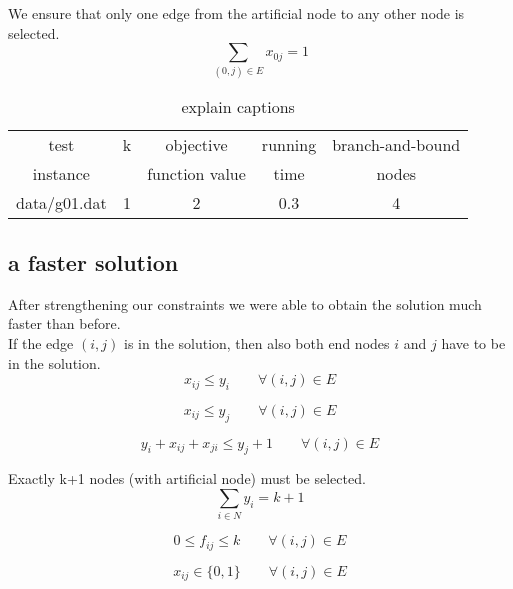 We ensure that only one edge from the artificial node to any
other node is selected.
\begin{equation}
  \sum_{(0,j) \in E} x_{0j} = 1 
\end{equation}

\begin{table} 
\small
\centering
\begin{tabular}{ccccc}
\hline
test     & k & objective      & running & branch-and-bound \\
instance &   & function value & time    & nodes \\
\hline
data/g01.dat 	& 1 & 2 & 0.3 & 4 \\

\hline
\end{tabular}
\caption{explain captions}
\label{tbl:scf_slow}
\end{table}

\subsection{a faster solution}

After strengthening our constraints we were able to obtain the solution much faster than before.\\

If the edge $(i,j)$ is in the solution, then also both end nodes $i$ and $j$ 
have to be in the solution.
\begin{equation}
  x_{ij} \leq y_{i} \qquad \forall (i,j) \in E
  \label{lbl:xy1}
\end{equation}

\begin{equation}
  x_{ij} \leq y_{j} \qquad \forall (i,j) \in E
  \label{lbl:xy2}
\end{equation}

\begin{equation}
 y_{i} + x_{ij} + x_{ji} \leq y_{j} + 1 \qquad \forall (i,j) \in E
 \label{lbl:xy3}
\end{equation}

Exactly k+1 nodes (with artificial node) must be selected.
\begin{equation}
  \sum_{i \in N} y_i = k + 1
  \label{lbl:yk}
\end{equation}

\begin{equation}
  0 \leq f_{ij} \leq k \qquad \forall (i,j) \in E
\end{equation}

\begin{equation}
  x_{ij} \in \{0,1\} \qquad \forall (i,j) \in E
\end{equation}

